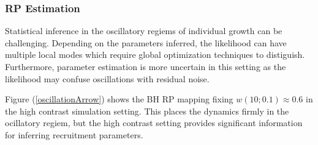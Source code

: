 %
\subsubsection{RP Estimation}

%
Statistical inference in the oscillatory regiems of individual growth can be 
challenging. Depending on the parameters inferred, the likelihood can have 
multiple local modes which require global optimization techniques to distiguish. 
Furthermore, parameter estimation is more uncertain in this setting as the 
likelihood may confuse oscillations with residual noise.

%

Figure (\ref{oscillationArrow}) shows the BH RP mapping fixing $w(10;0.1)\approx0.6$
in the high contrast simulation setting. This places the
dynamics firmly in the ocillatory regiem, but the high 
contrast setting provides significant information for 
inferring recruitment parameters.

